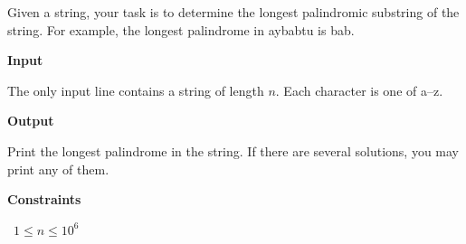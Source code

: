 Given a string, your task is to determine the longest palindromic substring of the string. For example, the longest palindrome in aybabtu is bab.

\vspace{0.3cm}\noindent\textbf{Input}

The only input line contains a string of length $n$. Each character is one of a–z.

\vspace{0.3cm}\noindent\textbf{Output}

Print the longest palindrome in the string. If there are several solutions, you may print any of them.

\vspace{0.3cm}\noindent\textbf{Constraints}

\textbullet\ $1 \le n \le 10^6$